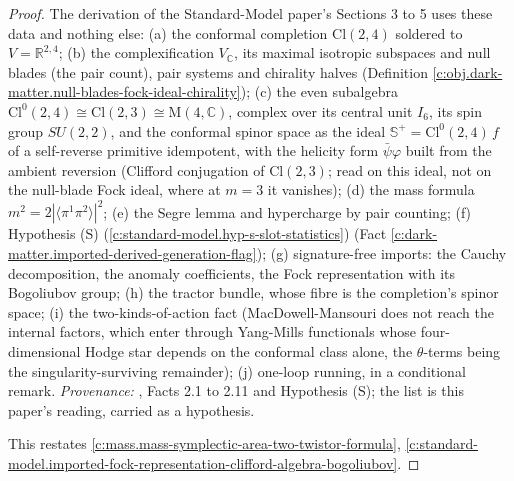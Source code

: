 \documentclass[11pt]{article}
\theoremstyle{definition}
\theoremstyle{plain}
\providecommand{\C}{}\renewcommand{\C}{\mathbb{C}}
\providecommand{\CS}{}\renewcommand{\CS}{{\mathbb{S}^{+}}}
\providecommand{\Cl}{}\renewcommand{\Cl}{\mathrm{Cl}}
\providecommand{\Mat}{}\renewcommand{\Mat}{\mathrm{M}}
\providecommand{\R}{}\renewcommand{\R}{\mathbb{R}}
\providecommand{\br}{}\renewcommand{\br}[1]{\langle #1\rangle}
\begin{document}
\begin{proof}
The derivation of the Standard-Model paper's Sections 3 to 5 uses these data and nothing else: (a) the conformal completion $\Cl(2,4)$ soldered to $V = \R^{2,4}$; (b) the complexification $V_{\C}$, its maximal isotropic subspaces and null blades (the pair count), pair systems and chirality halves (Definition \ref{c:obj.dark-matter.null-blades-fock-ideal-chirality}); (c) the even subalgebra $\Cl^{0}(2,4) \cong \Cl(2,3) \cong \Mat(4,\C)$, complex over its central unit $I_6$, its spin group $SU(2,2)$, and the conformal spinor space as the ideal $\CS = \Cl^{0}(2,4)\,f$ of a self-reverse primitive idempotent, with the helicity form $\bar{\psi}\varphi$ built from the ambient reversion (Clifford conjugation of $\Cl(2,3)$; read on this ideal, not on the null-blade Fock ideal, where at $m = 3$ it vanishes); (d) the mass formula $m^{2} = 2|\br{\pi^{1}\pi^{2}}|^{2}$; (e) the Segre lemma and hypercharge by pair counting; (f) Hypothesis (S) (\ref{c:standard-model.hyp-s-slot-statistics}) (Fact \ref{c:dark-matter.imported-derived-generation-flag}); (g) signature-free imports: the Cauchy decomposition, the anomaly coefficients, the Fock representation with its Bogoliubov group; (h) the tractor bundle, whose fibre is the completion's spinor space; (i) the two-kinds-of-action fact (MacDowell-Mansouri does not reach the internal factors, which enter through Yang-Mills functionals whose four-dimensional Hodge star depends on the conformal class alone, the $\theta$-terms being the singularity-surviving remainder); (j) one-loop running, in a conditional remark. \emph{Provenance:} \cite[\S\S2-5]{ButlerT12}, Facts 2.1 to 2.11 and Hypothesis (S); the list is this paper's reading, carried as a hypothesis.

This restates \ref{c:mass.mass-symplectic-area-two-twistor-formula}, \ref{c:standard-model.imported-fock-representation-clifford-algebra-bogoliubov}.

\end{proof}
\end{document}
